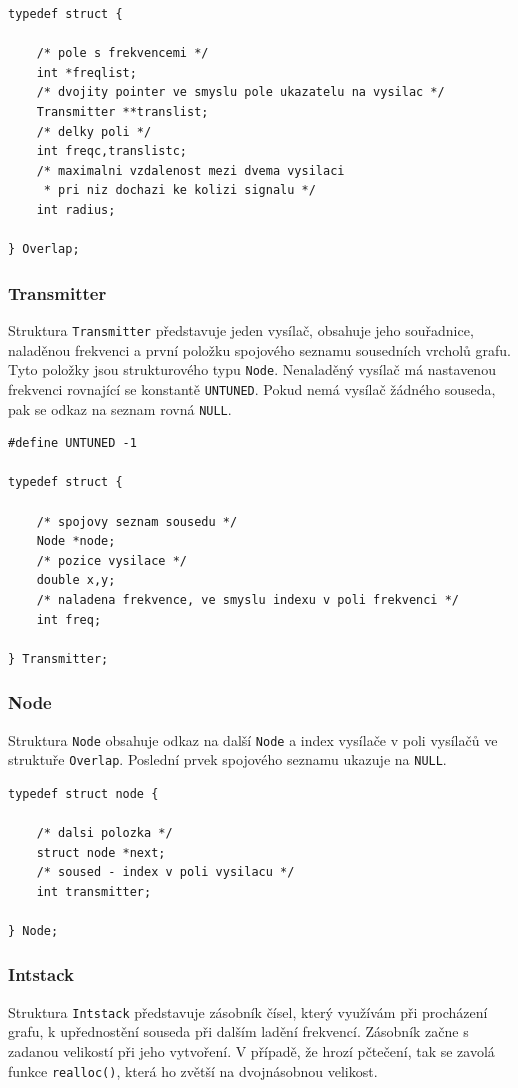 \documentclass[12pt,a4paper]{article}
\begin{document}
\begin{verbatim}
typedef struct {

    /* pole s frekvencemi */
    int *freqlist;
    /* dvojity pointer ve smyslu pole ukazatelu na vysilac */
    Transmitter **translist;
    /* delky poli */
    int freqc,translistc;
    /* maximalni vzdalenost mezi dvema vysilaci
     * pri niz dochazi ke kolizi signalu */
    int radius;

} Overlap;
\end{verbatim}

\subsubsection {Transmitter}
Struktura \texttt{Transmitter} představuje jeden vysílač, obsahuje jeho souřadnice,
naladěnou frekvenci a první položku spojového seznamu sousedních vrcholů grafu. Tyto
položky jsou strukturového typu \texttt{Node}. Nenaladěný vysílač má nastavenou
frekvenci rovnající se konstantě \texttt{UNTUNED}. Pokud nemá vysílač žádného souseda,
pak se odkaz na seznam rovná \texttt{NULL}.  

\begin{verbatim}
#define UNTUNED -1

typedef struct {

    /* spojovy seznam sousedu */
    Node *node;
    /* pozice vysilace */
    double x,y;
    /* naladena frekvence, ve smyslu indexu v poli frekvenci */
    int freq;

} Transmitter;
\end{verbatim}

\subsubsection {Node}
Struktura \texttt{Node} obsahuje odkaz na další \texttt{Node} a index vysílače 
v poli vysílačů ve struktuře \texttt{Overlap}. Poslední prvek spojového seznamu ukazuje na \texttt{NULL}.

\begin{verbatim}
typedef struct node {

    /* dalsi polozka */
    struct node *next;
    /* soused - index v poli vysilacu */
    int transmitter;

} Node;
\end{verbatim}

\subsubsection {Intstack}
Struktura \texttt{Intstack} představuje zásobník čísel, který využívám při procházení grafu, 
k upřednostění souseda při dalším ladění frekvencí. Zásobník začne s zadanou velikostí při jeho 
vytvoření. V případě, že hrozí pčtečení, tak se zavolá funkce \texttt{realloc()}, 
která ho zvětší na dvojnásobnou velikost.
\end{document}
